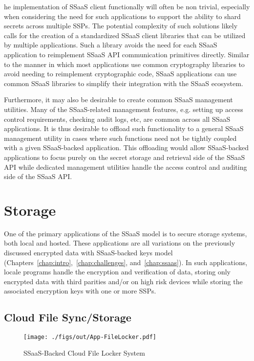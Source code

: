he implementation of SSaaS client functionally will often be non
trivial, especially when considering the need for such applications to
support the ability to shard secrets across multiple SSPs. The
potential complexity of such solutions likely calls for the creation
of a standardized SSaaS client libraries that can be utilized by
multiple applications. Such a library avoids the need for each SSaaS
application to reimplement SSaaS API communication primitives
directly. Similar to the manner in which most applications use common
cryptography libraries to avoid needing to reimplement cryptographic
code, SSaaS applications can use common SSaaS libraries to simplify
their integration with the SSaaS ecosystem.

Furthermore, it may also be desirable to create common SSaaS
management utilities. Many of the SSaaS-related management features,
e.g. setting up access control requirements, checking audit logs, etc,
are common across all SSaaS applications. It is thus desirable to
offload such functionality to a general SSaaS management utility in
cases where such functions need not be tightly coupled with a given
SSaaS-backed application. This offloading would allow SSaaS-backed
applications to focus purely on the secret storage and retrieval side
of the SSaaS API while dedicated management utilities handle the
access control and auditing side of the SSaaS API.

\section{Storage}

One of the primary applications of the SSaaS model is to secure
storage systems, both local and hosted. These applications are all
variations on the previously discussed encrypted data with
SSaaS-backed keys model
(Chapters~\ref{chap:intro},~\ref{chap:challenges},
and~\ref{chap:ssaas}). In such applications, locale programs handle
the encryption and verification of data, storing only encrypted data
with third parities and/or on high risk devices while storing the
associated encryption keys with one or more SSPs.

\subsection{Cloud File Sync/Storage}

\begin{figure}[t]
  \centering
  \texttt{[image: ./figs/out/App-FileLocker.pdf]}
  \caption{SSaaS-Backed Cloud File Locker System}
  \label{fig:apps-filestore}
\end{figure}

